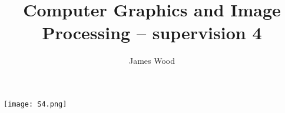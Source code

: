 \documentclass{article}
\begin{document}
\title{Computer Graphics and Image Processing -- supervision 4}
\author{James Wood}
\maketitle


\texttt{[image: S4.png]}
\centering
\end{document}
